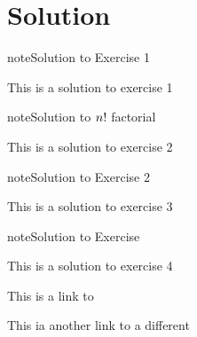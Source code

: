 \chapter{Solution}
\label{\detokenize{solution:solution}}\label{\detokenize{solution::doc}} \label{solution:solution-1}
\begin{sphinxadmonition}{note}{Solution to  Exercise 1}



\sphinxAtStartPar
This is a solution to exercise 1
\end{sphinxadmonition}
 \label{solution:solution-2}
\begin{sphinxadmonition}{note}{Solution to \protect\(n!\protect\) factorial}



\sphinxAtStartPar
This is a solution to exercise 2
\end{sphinxadmonition}
 \label{solution:solution-3}
\begin{sphinxadmonition}{note}{Solution to  Exercise 2}



\sphinxAtStartPar
This is a solution to exercise 3
\end{sphinxadmonition}
 \label{solution:solution-4}
\begin{sphinxadmonition}{note}{Solution to Exercise}



\sphinxAtStartPar
This is a solution to exercise 4
\end{sphinxadmonition}

\sphinxAtStartPar
This is a link to {\hyperref[\detokenize{solution:solution-1}]{}}

\sphinxAtStartPar
This ia another link to a different {\hyperref[\detokenize{solution:solution-3}]{}}



\renewcommand{\indexname}{Index}
\printindex

